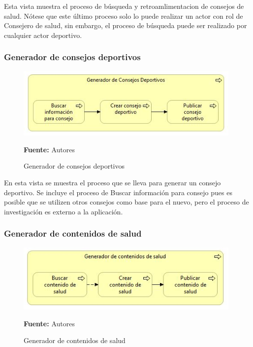 Esta vista muestra el proceso de búsqueda y retroamlimentacion de consejos de salud. Nótese que este último proceso solo lo puede realizar un actor con rol de Consejero de salud, sin embargo, el proceso de búsqueda puede ser realizado por cualquier actor deportivo.

\subsubsection{Generador de consejos deportivos}

\begin{figure}[!htb]
  \begin{center}
    \includegraphics[width=11cm]{./imagenes/Archimate/vistas/business_process/generadorconsejosdeportivos.png}
    \caption{Generador de consejos deportivos}
    \label{fig:BP_GeneradorConsejosDeportivos}
    \textbf{Fuente:}  Autores
  \end{center}
\end{figure}

En esta vista se muestra el proceso que se lleva para generar un consejo deportivo. Se incluye el proceso de Buscar información para consejo pues es posible que se utilizen otros consejos como base para el nuevo, pero el proceso de investigación es externo a la aplicación.

\subsubsection{Generador de contenidos de salud}

\begin{figure}[!htb]
  \begin{center}
    \includegraphics[width=11cm]{./imagenes/Archimate/vistas/business_process/generadorcontenidossalud.png}
    \caption{Generador de contenidos de salud}
    \label{fig:BP_GeneradorContenidosSalud}
    \textbf{Fuente:}  Autores
  \end{center}
\end{figure}

